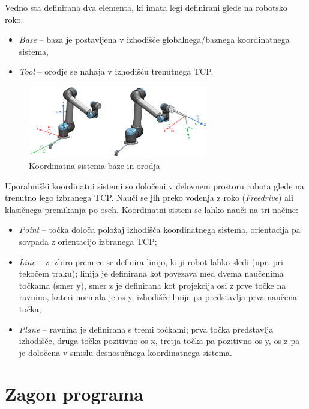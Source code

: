 Vedno sta definirana dva elementa, ki imata legi definirani glede na robotsko roko:
\begin{itemize}
  \item \emph{Base} -- baza je postavljena v izhodišče globalnega/baznega koordinatnega sistema,
  \item \emph{Tool} -- orodje se nahaja v izhodišču trenutnega TCP.
\end{itemize}


\begin{figure}[!hbt]
\centering
\includegraphics[width=0.7\textwidth]{ur5e_feat.eps}
\caption{Koordinatna sistema baze in orodja}
\label{fig:ur_feat}
\end{figure}

Uporabniški koordinatni sistemi so določeni v delovnem prostoru robota glede na trenutno lego izbranega TCP. Nauči se jih preko vodenja z roko (\emph{Freedrive}) ali klasičnega premikanja po oseh. Koordinatni sistem se lahko nauči na tri načine:
\begin{itemize}
    \item \emph{Point} -- točka določa položaj izhodišča koordinatnega sistema, orientacija pa sovpada z orientacijo izbranega TCP;
    \item \emph{Line} -- z izbiro premice se definira linijo, ki ji robot lahko sledi (npr. pri tekočem traku); linija je definirana kot povezava med dvema naučenima točkama (smer y), smer z je definirana kot projekcija osi z prve točke na ravnino, kateri normala je os y, izhodišče linije pa predstavlja prva naučena točka;
    \item \emph{Plane} -- ravnina je definirana s tremi točkami; prva točka predstavlja izhodišče, druga točka pozitivno os x, tretja točka pa pozitivno os y, os z pa je določena v smislu desnosučnega koordinatnega sistema.
\end{itemize}



\section{Zagon programa}

